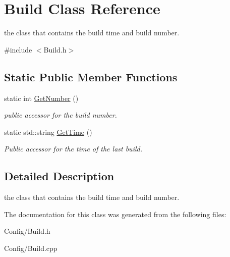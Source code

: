 \hypertarget{class_build}{
\section{\-Build \-Class \-Reference}
\label{class_build}
}


the class that contains the build time and build number.  




{\ttfamily \#include $<$\-Build.\-h$>$}

\subsection*{\-Static \-Public \-Member \-Functions}
\begin{DoxyCompactItemize}
\item 
\hypertarget{class_build_a9f5d52e1840e568016036c34124da091}{
static int \hyperlink{class_build_a9f5d52e1840e568016036c34124da091}{\-Get\-Number} ()}
\label{class_build_a9f5d52e1840e568016036c34124da091}

\begin{DoxyCompactList}\small\item\em public accessor for the build number. \end{DoxyCompactList}\item 
\hypertarget{class_build_a129bada4f288e35d2340e157f6414c1f}{
static std\-::string \hyperlink{class_build_a129bada4f288e35d2340e157f6414c1f}{\-Get\-Time} ()}
\label{class_build_a129bada4f288e35d2340e157f6414c1f}

\begin{DoxyCompactList}\small\item\em \-Public accessor for the time of the last build. \end{DoxyCompactList}\end{DoxyCompactItemize}


\subsection{\-Detailed \-Description}
the class that contains the build time and build number. 

\-The documentation for this class was generated from the following files\-:\begin{DoxyCompactItemize}
\item 
\-Config/\-Build.\-h\item 
\-Config/\-Build.\-cpp\end{DoxyCompactItemize}
